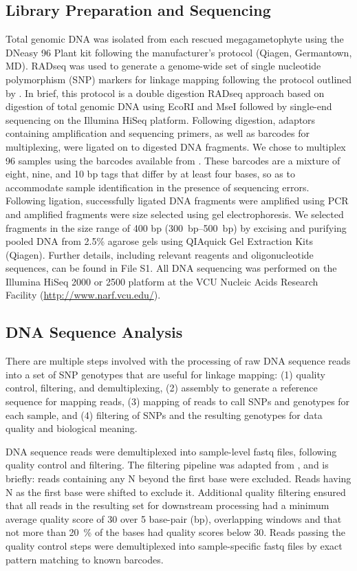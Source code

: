 \documentclass[11pt]{article}
\begin{document}
\subsection*{Library Preparation and Sequencing}
Total genomic DNA was isolated from each rescued megagametophyte using the DNeasy 96 Plant 
kit following the manufacturer’s protocol (Qiagen, Germantown, MD). RADseq \citep{Davey:2010, Parchman:2012, Peterson:2012} 
was used to generate a genome-wide set of 
single nucleotide polymorphism (SNP) markers for linkage mapping following the protocol 
outlined by \citet{Parchman:2012}. In brief, this protocol is a double digestion RADseq 
approach based on digestion of total genomic DNA using EcoRI and MseI followed by single-end 
sequencing on the Illumina HiSeq platform. Following digestion, adaptors 
containing amplification and sequencing primers, as well as barcodes for multiplexing, 
were ligated on to digested DNA fragments. We chose to multiplex 96 samples using the 
barcodes available from \citet{Parchman:2012}. These barcodes are a mixture of eight, nine, and 
10 bp tags that differ by at least four bases, so as to accommodate sample identification in the 
presence of sequencing errors. Following ligation, successfully ligated DNA fragments were 
amplified using PCR and amplified fragments were size selected using gel electrophoresis. We selected 
fragments in the size range of 400 bp (\SIrange{300}{500}{bp}) by excising and purifying pooled DNA from 2.5\% 
agarose gels using QIAquick Gel Extraction Kits (Qiagen). Further details, including relevant reagents and 
oligonucleotide sequences, can be found in File S1. All DNA sequencing was performed on the Illumina HiSeq 2000 or 2500
platform at the VCU Nucleic Acids Research Facility (\url{http://www.narf.vcu.edu/}).


\subsection*{DNA Sequence Analysis}

There are multiple steps involved with the processing of raw DNA sequence reads into a set of SNP genotypes that are useful for linkage mapping:
(1) quality control, filtering, and demultiplexing, (2) assembly to generate a reference sequence for mapping reads, (3) mapping 
of reads to call SNPs and genotypes for each sample, and (4) filtering of SNPs and the resulting genotypes for
data quality and biological meaning.

DNA sequence reads were demultiplexed into sample-level fastq files, following quality control 
and filtering.  The filtering pipeline was adapted from \citep{Friedline:2012fm}, and is briefly: reads 
containing any N beyond the first base were excluded. Reads having N as the first base were shifted 
to exclude it.  Additional quality filtering ensured that all reads in the resulting set for downstream 
processing had a minimum average quality score of 30 over 5 base-pair (bp), overlapping windows 
and that not more than \SI{20}{\percent} of the bases had quality scores below 30. Reads passing the 
quality control steps were demultiplexed into sample-specific fastq files by exact pattern matching to 
known barcodes.
\end{document}
